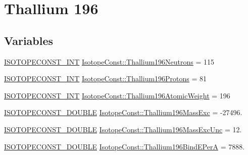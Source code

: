 \hypertarget{group___isotope_const-_thallium-_tl196}{}\section{Thallium 196}
\label{group___isotope_const-_thallium-_tl196}
\subsection*{Variables}
\begin{DoxyCompactItemize}
\item 
\mbox{\hyperlink{group___isotope_const-_macros_ga5f18360b3e99483a35c32d789e62621c}{I\+S\+O\+T\+O\+P\+E\+C\+O\+N\+S\+T\+\_\+\+I\+NT}} \mbox{\hyperlink{group___isotope_const-_thallium-_tl196_ga6d1ae5d872507461b1c466ad291e3e7f}{Isotope\+Const\+::\+Thallium196\+Neutrons}} = 115
\item 
\mbox{\hyperlink{group___isotope_const-_macros_ga5f18360b3e99483a35c32d789e62621c}{I\+S\+O\+T\+O\+P\+E\+C\+O\+N\+S\+T\+\_\+\+I\+NT}} \mbox{\hyperlink{group___isotope_const-_thallium-_tl196_ga3b0c94fc08ad3c068f24c5ec16c80478}{Isotope\+Const\+::\+Thallium196\+Protons}} = 81
\item 
\mbox{\hyperlink{group___isotope_const-_macros_ga5f18360b3e99483a35c32d789e62621c}{I\+S\+O\+T\+O\+P\+E\+C\+O\+N\+S\+T\+\_\+\+I\+NT}} \mbox{\hyperlink{group___isotope_const-_thallium-_tl196_ga0e7401a0358ca0b4bfbe06f409ebef77}{Isotope\+Const\+::\+Thallium196\+Atomic\+Weight}} = 196
\item 
\mbox{\hyperlink{group___isotope_const-_macros_ga8f45a7272ce02c0b4c65c44636ed719a}{I\+S\+O\+T\+O\+P\+E\+C\+O\+N\+S\+T\+\_\+\+D\+O\+U\+B\+LE}} \mbox{\hyperlink{group___isotope_const-_thallium-_tl196_ga0503ec91b69e7c47eb035a111f4795f5}{Isotope\+Const\+::\+Thallium196\+Mass\+Exc}} = -\/27496.
\item 
\mbox{\hyperlink{group___isotope_const-_macros_ga8f45a7272ce02c0b4c65c44636ed719a}{I\+S\+O\+T\+O\+P\+E\+C\+O\+N\+S\+T\+\_\+\+D\+O\+U\+B\+LE}} \mbox{\hyperlink{group___isotope_const-_thallium-_tl196_ga1c4f3587f57f8eefb1b0cae9feca1d48}{Isotope\+Const\+::\+Thallium196\+Mass\+Exc\+Unc}} = 12.
\item 
\mbox{\hyperlink{group___isotope_const-_macros_ga8f45a7272ce02c0b4c65c44636ed719a}{I\+S\+O\+T\+O\+P\+E\+C\+O\+N\+S\+T\+\_\+\+D\+O\+U\+B\+LE}} \mbox{\hyperlink{group___isotope_const-_thallium-_tl196_ga216b71f739f0b147fa33e7393f914c34}{Isotope\+Const\+::\+Thallium196\+Bind\+E\+PerA}} = 7888.
\item 

\end{DoxyCompactItemize}
